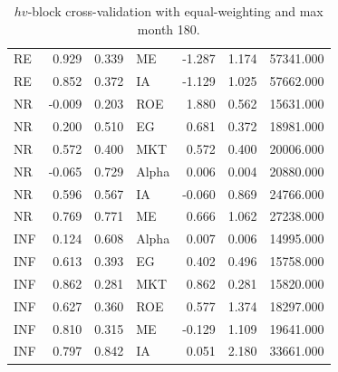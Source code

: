 \documentclass[12pt]{article}
\begin{document}
\begin{table}[ht]
\begin{tabular}{lrrlrrr}
RE & 0.929 & 0.339 & ME & -1.287 & 1.174 & 57341.000 \\ 
RE & 0.852 & 0.372 & IA & -1.129 & 1.025 & 57662.000 \\ 
\hline
NR & -0.009 & 0.203 & ROE & 1.880 & 0.562 & 15631.000 \\ 
NR & 0.200 & 0.510 & EG & 0.681 & 0.372 & 18981.000 \\ 
NR & 0.572 & 0.400 & MKT & 0.572 & 0.400 & 20006.000 \\ 
NR & -0.065 & 0.729 & Alpha & 0.006 & 0.004 & 20880.000 \\ 
NR & 0.596 & 0.567 & IA & -0.060 & 0.869 & 24766.000 \\ 
NR & 0.769 & 0.771 & ME & 0.666 & 1.062 & 27238.000 \\ 
\hline
INF & 0.124 & 0.608 & Alpha & 0.007 & 0.006 & 14995.000 \\ 
INF & 0.613 & 0.393 & EG & 0.402 & 0.496 & 15758.000 \\ 
INF & 0.862 & 0.281 & MKT & 0.862 & 0.281 & 15820.000 \\ 
INF & 0.627 & 0.360 & ROE & 0.577 & 1.374 & 18297.000 \\ 
INF & 0.810 & 0.315 & ME & -0.129 & 1.109 & 19641.000 \\ 
INF & 0.797 & 0.842 & IA & 0.051 & 2.180 & 33661.000 \\ 
		\hline
		\hline
	\end{tabular}
	\caption{$hv$-block cross-validation with equal-weighting and max month 180.} 
	\label{tab:cv_180_EW_VYP_SL}
\end{table}
\end{document}
